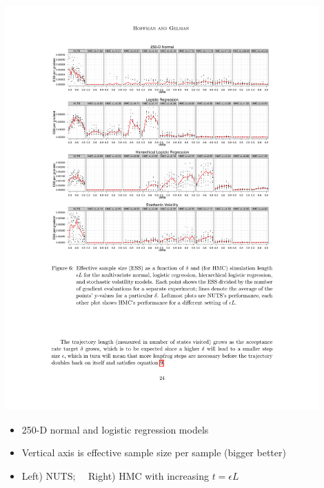 \documentclass[10pt]{report}
\begin{document}
\includegraphics[width=0.9\textwidth]{img/nuts-ess-1.pdf}
{\small
  \begin{itemize}
  \item 250-D normal and logistic regression models
  \item Vertical axis is effective sample size per sample (bigger better)
  \item Left) NUTS; \ \ Right) HMC with increasing $t = \epsilon L$
  \end{itemize}
}

\end{document}

